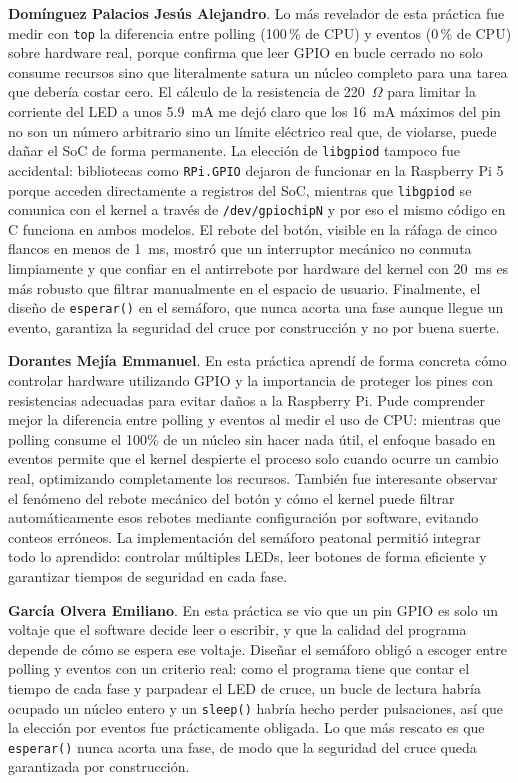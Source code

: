\documentclass[conference]{IEEEtran}
\begin{document}
\textbf{Domínguez Palacios Jesús Alejandro}. Lo más revelador de esta práctica fue medir con \texttt{top} la diferencia entre polling (100\,\% de CPU) y eventos (0\,\% de CPU) sobre hardware real, porque confirma que leer GPIO en bucle cerrado no solo consume recursos sino que literalmente satura un núcleo completo para una tarea que debería costar cero. El cálculo de la resistencia de 220~$\Omega$ para limitar la corriente del LED a unos 5.9~mA me dejó claro que los 16~mA máximos del pin no son un número arbitrario sino un límite eléctrico real que, de violarse, puede dañar el SoC de forma permanente. La elección de \texttt{libgpiod} tampoco fue accidental: bibliotecas como \texttt{RPi.GPIO} dejaron de funcionar en la Raspberry Pi 5 porque acceden directamente a registros del SoC, mientras que \texttt{libgpiod} se comunica con el kernel a través de \texttt{/dev/gpiochipN} y por eso el mismo código en C funciona en ambos modelos. El rebote del botón, visible en la ráfaga de cinco flancos en menos de 1~ms, mostró que un interruptor mecánico no conmuta limpiamente y que confiar en el antirrebote por hardware del kernel con 20~ms es más robusto que filtrar manualmente en el espacio de usuario. Finalmente, el diseño de \texttt{esperar()} en el semáforo, que nunca acorta una fase aunque llegue un evento, garantiza la seguridad del cruce por construcción y no por buena suerte.

\textbf{Dorantes Mejía Emmanuel}. En esta práctica aprendí de forma concreta cómo controlar hardware utilizando GPIO y la importancia de proteger los pines con resistencias adecuadas para evitar daños a la Raspberry Pi. Pude comprender mejor la diferencia entre polling y eventos al medir el uso de CPU: mientras que polling consume el 100\% de un núcleo sin hacer nada útil, el enfoque basado en eventos permite que el kernel despierte el proceso solo cuando ocurre un cambio real, optimizando completamente los recursos. También fue interesante observar el fenómeno del rebote mecánico del botón y cómo el kernel puede filtrar automáticamente esos rebotes mediante configuración por software, evitando conteos erróneos. La implementación del semáforo peatonal permitió integrar todo lo aprendido: controlar múltiples LEDs, leer botones de forma eficiente y garantizar tiempos de seguridad en cada fase. 

\textbf{García Olvera Emiliano}. En esta práctica se vio que un pin GPIO es solo un voltaje que el software decide leer o escribir, y que la calidad del programa depende de cómo se espera ese voltaje. Diseñar el semáforo obligó a escoger entre polling y eventos con un criterio real: como el programa tiene que contar el tiempo de cada fase y parpadear el LED de cruce, un bucle de lectura habría ocupado un núcleo entero y un \texttt{sleep()} habría hecho perder pulsaciones, así que la elección por eventos fue prácticamente obligada. Lo que más rescato es que \texttt{esperar()} nunca acorta una fase, de modo que la seguridad del cruce queda garantizada por construcción.
\end{document}
